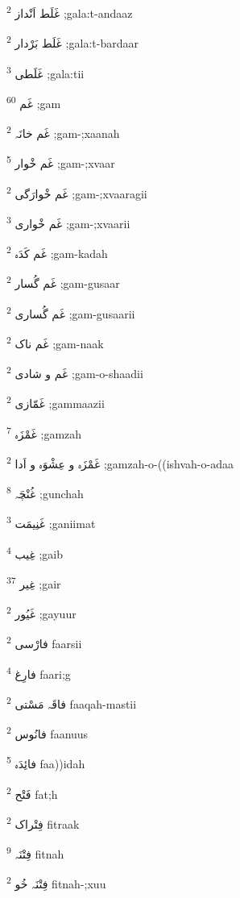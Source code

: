 \documentclass[12pt]{article}
\begin{document}
\begin{RTL}
\begin{multicols}{5}
{\ur غَلَط اَنْداز}   \textsuperscript{2} ;gala:t-andaaz

{\ur غَلَط بَرْدار}   \textsuperscript{2} ;gala:t-bardaar

{\ur غَلَطی}   \textsuperscript{3} ;gala:tii

{\ur غَم}   \textsuperscript{60} ;gam

{\ur غَم خانَہ}   \textsuperscript{2} ;gam-;xaanah

{\ur غَم خْوار}   \textsuperscript{5} ;gam-;xvaar

{\ur غَم خْوارَگی}   \textsuperscript{2} ;gam-;xvaaragii

{\ur غَم خْواری}   \textsuperscript{3} ;gam-;xvaarii

{\ur غَم کَدَہ}   \textsuperscript{2} ;gam-kadah

{\ur غَم گُسار}   \textsuperscript{2} ;gam-gusaar

{\ur غَم گُساری}   \textsuperscript{2} ;gam-gusaarii

{\ur غَم ناک}   \textsuperscript{2} ;gam-naak

{\ur غَم و شادی}   \textsuperscript{2} ;gam-o-shaadii

{\ur غَمّازی}   \textsuperscript{2} ;gammaazii

{\ur غَمْزَہ}   \textsuperscript{7} ;gamzah

{\ur غَمْزَہ و عِشْوَہ و اَدا}   \textsuperscript{2} ;gamzah-o-((ishvah-o-adaa

{\ur غُنْچَہ}   \textsuperscript{8} ;gunchah

{\ur غَنِیمَت}   \textsuperscript{3} ;ganiimat

{\ur غِیب}   \textsuperscript{4} ;gaib

{\ur غِیر}   \textsuperscript{37} ;gair

{\ur غَیُور}   \textsuperscript{2} ;gayuur

{\ur فارْسی}   \textsuperscript{2} faarsii

{\ur فارِغ}   \textsuperscript{4} faari;g

{\ur فاقَہ مَسْتی}   \textsuperscript{2} faaqah-mastii

{\ur فانُوس}   \textsuperscript{2} faanuus

{\ur فائِدَہ}   \textsuperscript{5} faa))idah

{\ur فَتْح}   \textsuperscript{2} fat;h

{\ur فِتْراک}   \textsuperscript{2} fitraak

{\ur فِتْنَہ}   \textsuperscript{9} fitnah

{\ur فِتْنَہ خُو}   \textsuperscript{2} fitnah-;xuu


\end{multicols}
\end{RTL}
\end{document}
